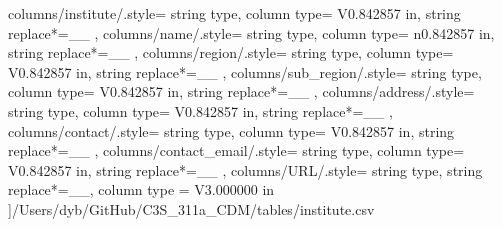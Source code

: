 \begin{landscape}
    columns/institute/.style={
            string type, 
            column type= V{0.842857 in}, 
            string replace*={_}{\_}
        },
    columns/name/.style={
            string type, 
            column type= n{0.842857 in}, 
            string replace*={_}{\_}
        },
    columns/region/.style={
            string type, 
            column type= V{0.842857 in}, 
            string replace*={_}{\_}
        },
    columns/sub_region/.style={
            string type, 
            column type= V{0.842857 in}, 
            string replace*={_}{\_}
        },
    columns/address/.style={
            string type, 
            column type= V{0.842857 in}, 
            string replace*={_}{\_}
        },
    columns/contact/.style={
            string type, 
            column type= V{0.842857 in}, 
            string replace*={_}{\_}
        },
    columns/contact_email/.style={
            string type, 
            column type= V{0.842857 in}, 
            string replace*={_}{\_}
        },
    columns/URL/.style={
            string type, 
            string replace*={_}{\_},
            column type = V{3.000000 in}
        }
    ]{/Users/dyb/GitHub/C3S_311a_CDM/tables/institute.csv}
\end{landscape}
